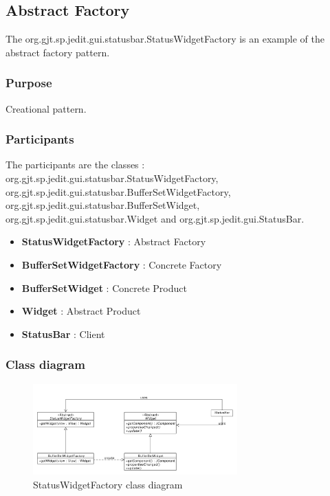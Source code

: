 \documentclass[a4paper,10pt]{article}
\begin{document}
\subsection{Abstract Factory}%
The org.gjt.sp.jedit.gui.statusbar.StatusWidgetFactory is an example of the abstract factory pattern.

\subsubsection{Purpose}
Creational pattern.
\subsubsection{Participants}
The participants are the classes : org.gjt.sp.jedit.gui.statusbar.StatusWidgetFactory, org.gjt.sp.jedit.gui.statusbar.BufferSetWidgetFactory, org.gjt.sp.jedit.gui.statusbar.BufferSetWidget, org.gjt.sp.jedit.gui.statusbar.Widget and org.gjt.sp.jedit.gui.StatusBar.

\begin{itemize}
 \item \textbf{StatusWidgetFactory} : Abstract Factory
 \item \textbf{BufferSetWidgetFactory} : Concrete Factory
 \item \textbf{BufferSetWidget} : Concrete Product
 \item \textbf{Widget} : Abstract Product
 \item \textbf{StatusBar} : Client
\end{itemize}

\subsubsection{Class diagram}
\begin{center}
\begin{figure}[h]
  \centerline{\includegraphics[width=0.7\textwidth]{abstractfactory-statuswidgetfactory-class-diagram.pdf}}
  \caption{StatusWidgetFactory class diagram}
\end{figure}
\end{center}
\end{document}

